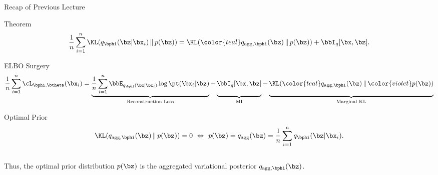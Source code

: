 \documentclass{beamer}
\begin{document}
\begin{frame}{Recap of Previous Lecture}
	\vspace{-0.3cm}
	\begin{block}{Theorem}
		\vspace{-0.6cm}
		\[
			\frac{1}{n} \sum_{i=1}^n \KL(q_{\bphi}(\bz| \bx_i) \,\|\, p(\bz)) = \KL({\color{teal}q_{\text{agg}, \bphi}(\bz) } \,\|\, p(\bz)) + \bbI_{q} [\bx, \bz].
		\]
		\vspace{-0.6cm}
	\end{block}
	\begin{block}{ELBO Surgery}
		\vspace{-0.5cm}
		{\small
		\[		  
		    \frac{1}{n} \sum_{i=1}^n \cL_{\bphi, \btheta}(\bx_i) = \underbrace{\frac{1}{n} \sum_{i=1}^n \bbE_{q_{\bphi}(\bz| \bx_i)} \log \pt(\bx_i | \bz)}_{\text{Reconstruction Loss}}
		    - \underbrace{\vphantom{\sum_{i=1}^n} \bbI_q [\bx, \bz]}_{\text{MI}} - \underbrace{\vphantom{\sum_{i=1}^n} \KL({\color{teal}q_{\text{agg}, \bphi}(\bz)} \,\|\, {\color{violet}p(\bz)})}_{\text{Marginal KL}}
		\]}
	\end{block}
	\vspace{-0.7cm}
	\begin{block}{Optimal Prior}
		\vspace{-0.7cm}
		\[
			\KL(q_{\text{agg}, \bphi}(\bz) \,\|\, p(\bz)) = 0 \ \Leftrightarrow \ p (\bz) = q_{\text{agg}}(\bz) = \frac{1}{n} \sum_{i=1}^n q_{\bphi}(\bz| \bx_i).
		\]
		\vspace{-0.5cm}\\
		Thus, the optimal prior distribution $p(\bz)$ is the aggregated variational posterior $q_{\text{agg}, \bphi}(\bz)$.
	\end{block}
\end{frame}
\end{document}
